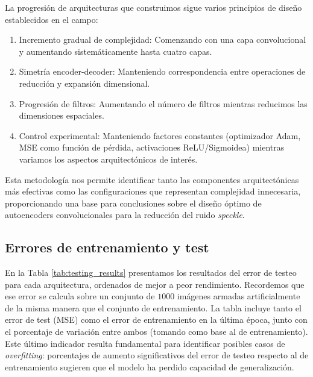 
La progresión de arquitecturas que construimos sigue varios principios de diseño establecidos en el campo:

\begin{enumerate}
    \item Incremento gradual de complejidad: Comenzando con una capa convolucional y aumentando sistemáticamente hasta cuatro capas.

    \item Simetría encoder-decoder: Manteniendo correspondencia entre operaciones de reducción y expansión dimensional.

    \item Progresión de filtros: Aumentando el número de filtros mientras reducimos las dimensiones espaciales.

    \item Control experimental: Manteniendo factores constantes (optimizador Adam, MSE como función de pérdida, activaciones ReLU/Sigmoidea) mientras variamos los aspectos arquitectónicos de interés.
\end{enumerate}

Esta metodología nos permite identificar tanto las componentes arquitectónicas más efectivas como las configuraciones que representan complejidad innecesaria, proporcionando una base para conclusiones sobre el diseño óptimo de autoencoders convolucionales para la reducción del ruido \emph{speckle}.

\subsection{Errores de entrenamiento y test}

En la Tabla \ref{tab:testing_results} presentamos los resultados del error de testeo para cada arquitectura, ordenados de mejor a peor rendimiento. Recordemos que ese error se calcula sobre un conjunto de $1000$ imágenes armadas artificialmente de la misma manera que el conjunto de entrenamiento. La tabla incluye tanto el error de test (MSE) como el error de entrenamiento en la última época, junto con el porcentaje de variación entre ambos (tomando como base al de entrenamiento). Este último indicador resulta fundamental para identificar posibles casos de \emph{overfitting}: porcentajes de aumento significativos del error de testeo respecto al de entrenamiento sugieren que el modelo ha perdido capacidad de generalización.

